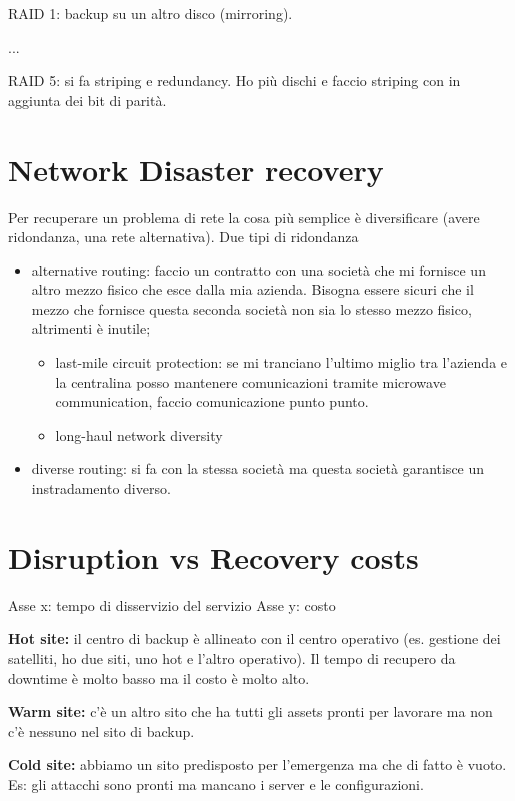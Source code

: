 RAID 1: backup su un altro disco (mirroring).

...

RAID 5: si fa striping e redundancy. Ho più dischi e faccio striping con in aggiunta dei bit di parità.

\section{Network Disaster recovery}

Per recuperare un problema di rete la cosa più semplice è diversificare (avere ridondanza, una rete alternativa). Due tipi di ridondanza
\begin{itemize}
\item alternative routing: faccio un contratto con una società che mi fornisce un altro mezzo fisico che esce dalla mia azienda. Bisogna essere sicuri che il mezzo che fornisce questa seconda società non sia lo stesso mezzo fisico, altrimenti è inutile;
\begin{itemize}
\item last-mile circuit protection: se mi tranciano l'ultimo miglio tra l'azienda e la centralina posso mantenere comunicazioni tramite microwave communication, faccio comunicazione punto punto.
\item long-haul network diversity
\end{itemize}
\item diverse routing: si fa con la stessa società ma questa società garantisce un instradamento diverso.
\end{itemize}

\section{Disruption vs Recovery costs}


Asse x: tempo di disservizio del servizio
Asse y: costo

\textbf{Hot site:} il centro di backup è allineato con il centro operativo (es. gestione dei satelliti, ho due siti, uno hot e l'altro operativo). Il tempo di recupero da downtime è molto basso ma il costo è molto alto.

\textbf{Warm site:} c'è un altro sito che ha tutti gli assets pronti per lavorare ma non c'è nessuno nel sito di backup.

\textbf{Cold site:} abbiamo un sito predisposto per l'emergenza ma che di fatto è vuoto. Es: gli attacchi sono pronti ma mancano i server e le configurazioni.

